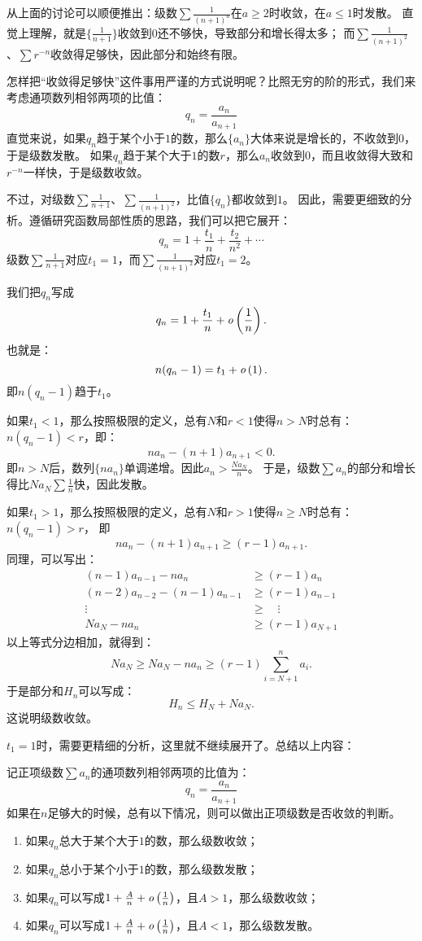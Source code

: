 \documentclass[12pt,UTF8]{ctexbook}
\begin{document}
从上面的讨论可以顺便推出：级数$\sum \frac{1}{(n+1)^a}$在$a\geqslant 2$时收敛，在$a\leqslant 1$时发散。
直觉上理解，就是$\{\frac{1}{n+1}\}$收敛到$0$还不够快，导致部分和增长得太多；
而$\sum \frac{1}{(n+1)^2}$、$\sum r^{-n}$收敛得足够快，因此部分和始终有限。

怎样把“收敛得足够快”这件事用严谨的方式说明呢？比照无穷的阶的形式，我们来考虑通项数列相邻两项的比值：
$$ q_n = \frac{a_n}{a_{n+1}} $$
直觉来说，如果$q_n$趋于某个小于$1$的数，那么$\{a_n\}$大体来说是增长的，不收敛到$0$，于是级数发散。
如果$q_n$趋于某个大于$1$的数$r$，那么$a_n$收敛到$0$，而且收敛得大致和$r^{-n}$一样快，于是级数收敛。

不过，对级数$\sum \frac{1}{n+1}$、$\sum \frac{1}{(n+1)^2}$，比值$\{q_n\}$都收敛到$1$。
因此，需要更细致的分析。遵循研究函数局部性质的思路，我们可以把它展开：
$$ q_n = 1 + \frac{t_1}{n} + \frac{t_2}{n^2} + \cdots $$
级数$\sum \frac{1}{n+1}$对应$t_1 = 1$，而$\sum \frac{1}{(n+1)^2}$对应$t_1 = 2$。

我们把$q_n$写成
$$ q_n = 1 + \frac{t_1}{n} + \mathit{o}\left(\frac{1}{n}\right). $$
也就是：
$$ n(q_n - 1) = t_1 + \mathit{o}\left(1\right).$$
即$n(q_n - 1)$趋于$t_1$。

如果$t_1 < 1$，那么按照极限的定义，总有$N$和$r<1$使得$n>N$时总有：$n(q_n - 1) < r$，即：
$$ na_n - (n+1)a_{n+1} < 0. $$
即$n>N$后，数列$\{na_n\}$单调递增。因此$a_n > \frac{Na_N}{n}$。
于是，级数$\sum a_n$的部分和增长得比$Na_N\sum \frac{1}{n}$快，因此发散。

如果$t_1 > 1$，那么按照极限的定义，总有$N$和$r>1$使得$n\geqslant N$时总有：$n(q_n - 1) > r$，
即
$$ na_n - (n+1)a_{n+1} \geqslant (r - 1)a_{n+1}.  $$
同理，可以写出：
\begin{align*}
    (n-1)a_{n-1} - na_n &\geqslant (r - 1)a_{n}  \\
    (n-2)a_{n-2} - (n-1)a_{n-1} &\geqslant (r - 1)a_{n-1}  \\
    \vdots \quad &\geqslant \quad \vdots  \\
    Na_{N} - na_n &\geqslant (r - 1)a_{N+1} 
\end{align*}
以上等式分边相加，就得到：
$$ Na_{N} \geqslant Na_{N} - na_n \geqslant (r - 1)\sum_{i=N+1}^n a_i. $$
于是部分和$H_n$可以写成：
$$ H_n \leqslant H_N + Na_{N}.$$
这说明级数收敛。

$t_1 = 1$时，需要更精细的分析，这里就不继续展开了。总结以上内容：

记正项级数$\sum a_n$的通项数列相邻两项的比值为：
$$ q_n = \frac{a_n}{a_{n+1}} $$
如果在$n$足够大的时候，总有以下情况，则可以做出正项级数是否收敛的判断。
\begin{enumerate}
    \item 如果$q_n$总大于某个大于$1$的数，那么级数收敛；
    \item 如果$q_n$总小于某个小于$1$的数，那么级数发散；
    \item 如果$q_n$可以写成$1 + \frac{A}{n} + \mathit{o}\left(\frac{1}{n}\right)$，且$A > 1$，那么级数收敛；
    \item 如果$q_n$可以写成$1 + \frac{A}{n} + \mathit{o}\left(\frac{1}{n}\right)$，且$A < 1$，那么级数发散。
\end{enumerate}
\end{document}
